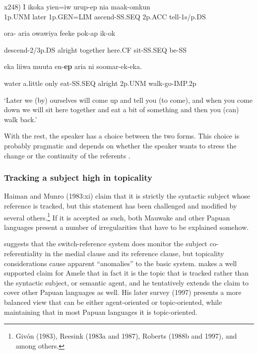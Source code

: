   x248)  I  ikoka  yien=iw  urup-ep  nia  maak-omkun\\
1p.UNM  later  1p.GEN=LIM  ascend-SS.SEQ  2p.ACC  tell-1s/p.DS

ora-  aria  owawiya  feeke  pok-ap  ik-ok

descend-2/3p.DS  alright  together  here.CF  sit-SS.SEQ  be-SS

eka  liiwa  muuta  en-\textbf{ep}  aria  ni  soomar-ek-eka.

water  a.little  only  eat-SS.SEQ  alright  2p.UNM  walk-go-IMP.2p

`Later we (by) ourselves will come up and tell you (to come), and when you come down we will sit here together and eat a bit of something and then you (can) walk back.'

With the rest, the speaker has a choice between the two forms. This choice is probably pragmatic and depends on whether the speaker wants to stress the change or the continuity of the referents \citep[47]{Franklin1983}. 

\subsubsection[Tracking a subject high in topicality ]{Tracking a subject high in topicality} 
\hypertarget{RefHeading23201935131865}{}
Haiman and Munro (1983:xi) claim that it is strictly the syntactic subject whose reference is tracked, but this statement has been challenged and modified by several others.\footnote{Giv\'on (1983), Reesink (1983a and 1987), Roberts (1988b and 1997), and \citet{Farr1999} among others.} If it is accepted as such, both Mauwake and other Papuan languages present a number of irregularities that have to be explained somehow.

\citet[242-3]{Reesink1983a} suggests that the switch-reference system does monitor the subject co-referentiality in the medial clause and its reference clause, but topicality considerations cause apparent ``anomalies'' to the basic system.  \citet{Roberts1988b} makes a well supported claim for Amele that in fact it is the topic that is tracked rather than the syntactic subject, or semantic agent, and he tentatively extends the claim to cover other Papuan languages as well. His later survey (1997) presents a more balanced view that  can be either agent-oriented or topic-oriented, while maintaining that in most Papuan languages it is topic-oriented. 

